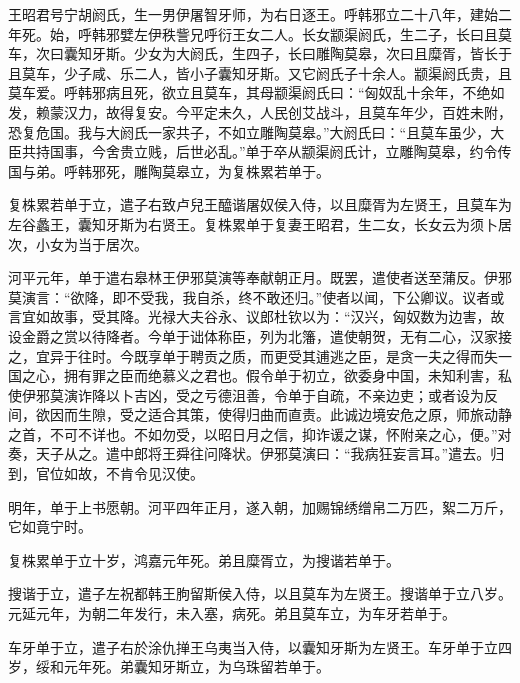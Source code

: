 \documentclass[12pt,UTF8]{ctexbook}
\begin{document}
王昭君号宁胡阏氏，生一男伊屠智牙师，为右日逐王。呼韩邪立二十八年，建始二年死。始，呼韩邪嬖左伊秩訾兄呼衍王女二人。长女颛渠阏氏，生二子，长曰且莫车，次曰囊知牙斯。少女为大阏氏，生四子，长曰雕陶莫皋，次曰且糜胥，皆长于且莫车，少子咸、乐二人，皆小子囊知牙斯。又它阏氏子十余人。颛渠阏氏贵，且莫车爱。呼韩邪病且死，欲立且莫车，其母颛渠阏氏曰：“匈奴乱十余年，不绝如发，赖蒙汉力，故得复安。今平定未久，人民创艾战斗，且莫车年少，百姓未附，恐复危国。我与大阏氏一家共子，不如立雕陶莫皋。”大阏氏曰：“且莫车虽少，大臣共持国事，今舍贵立贱，后世必乱。”单于卒从颛渠阏氏计，立雕陶莫皋，约令传国与弟。呼韩邪死，雕陶莫皋立，为复株累若单于。



复株累若单于立，遣子右致卢兒王醯谐屠奴侯入侍，以且糜胥为左贤王，且莫车为左谷蠡王，囊知牙斯为右贤王。复株累单于复妻王昭君，生二女，长女云为须卜居次，小女为当于居次。



河平元年，单于遣右皋林王伊邪莫演等奉献朝正月。既罢，遣使者送至蒲反。伊邪莫演言：“欲降，即不受我，我自杀，终不敢还归。”使者以闻，下公卿议。议者或言宜如故事，受其降。光禄大夫谷永、议郎杜钦以为：“汉兴，匈奴数为边害，故设金爵之赏以待降者。今单于诎体称臣，列为北籓，遣使朝贺，无有二心，汉家接之，宜异于往时。今既享单于聘贡之质，而更受其逋逃之臣，是贪一夫之得而失一国之心，拥有罪之臣而绝慕义之君也。假令单于初立，欲委身中国，未知利害，私使伊邪莫演诈降以卜吉凶，受之亏德沮善，令单于自疏，不亲边吏；或者设为反间，欲因而生隙，受之适合其策，使得归曲而直责。此诚边境安危之原，师旅动静之首，不可不详也。不如勿受，以昭日月之信，抑诈谖之谋，怀附亲之心，便。”对奏，天子从之。遣中郎将王舜往问降状。伊邪莫演曰：“我病狂妄言耳。”遣去。归到，官位如故，不肯令见汉使。



明年，单于上书愿朝。河平四年正月，遂入朝，加赐锦绣缯帛二万匹，絮二万斤，它如竟宁时。



复株累单于立十岁，鸿嘉元年死。弟且糜胥立，为搜谐若单于。



搜谐于立，遣子左祝都韩王朐留斯侯入侍，以且莫车为左贤王。搜谐单于立八岁。元延元年，为朝二年发行，未入塞，病死。弟且莫车立，为车牙若单于。



车牙单于立，遣子右於涂仇掸王乌夷当入侍，以囊知牙斯为左贤王。车牙单于立四岁，绥和元年死。弟囊知牙斯立，为乌珠留若单于。
\end{document}
